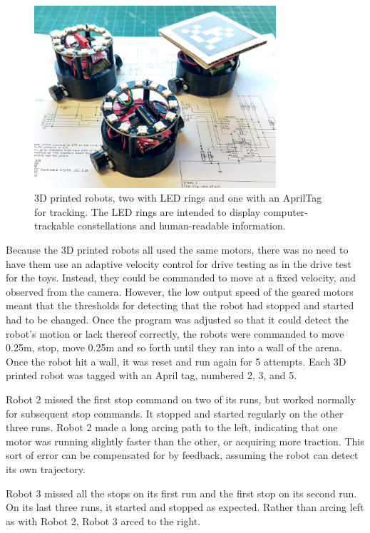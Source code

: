 \begin{figure}
	\centering
	\includegraphics[width=0.8\textwidth]{../3dp_robo.png}
	\caption{3D printed robots, two with LED rings and one with an AprilTag for tracking. The LED rings are intended to display computer-trackable constellations and human-readable information.}
	\label{fig:3dp_robos}
\end{figure}


Because the 3D printed robots all used the same motors, there was no need to have them use an adaptive velocity control for drive testing as in the drive test for the toys. 
Instead, they could be commanded to move at a fixed velocity, and observed from the camera. 
However, the low output speed of the geared motors meant that the thresholds for detecting that the robot had stopped and started had to be changed. 
Once the program was adjusted so that it could detect the robot's motion or lack thereof correctly, the robots were commanded to move 0.25m, stop, move 0.25m and so forth until they ran into a wall of the arena. 
Once the robot hit a wall, it was reset and run again for 5 attempts. 
Each 3D printed robot was tagged with an April tag, numbered 2, 3, and 5. 

Robot 2 missed the first stop command on two of its runs, but worked normally for subsequent stop commands. 
It stopped and started regularly on the other three runs.
Robot 2 made a long arcing path to the left, indicating that one motor was running slightly faster than the other, or acquiring more traction.
This sort of error can be compensated for by feedback, assuming the robot can detect its own trajectory. 

Robot 3 missed all the stops on its first run and the first stop on its second run.
On its last three runs, it started and stopped as expected. 
Rather than arcing left as with Robot 2, Robot 3 arced to the right. 

